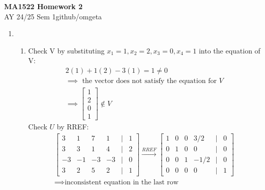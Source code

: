 \documentclass[12pt, a4paper]{article}
\newcommand{\mytitle}{MA1522 Homework 2}
\newcommand{\myauthor}{github/omgeta}
\newcommand{\mydate}{AY 24/25 Sem 1}
\begin{document}
\raggedright
\footnotesize
\begin{center}
{\normalsize{\textbf{\mytitle}}} \\
{\footnotesize{\mydate\hspace{2pt}\textemdash\hspace{2pt}\myauthor}}
\end{center}

\begin{enumerate}[Q\arabic*.]
  \item 
    \begin{enumerate}[(\alph*)]
      \item Check V by substituting $x_1 = 1, x_2 = 2, x_3 = 0, x_4 = 1$ into the equation of V:
        \begin{gather*}
          2(1) + 1(2) -3(1) = 1 \neq 0\\
                            \implies \text{ the vector does not satisfy the equation for }V \\
                            \implies  \begin{bmatrix}1\\2\\0\\1\end{bmatrix} \not\in V
        \end{gather*}
        Check $U$ by RREF:
        \begin{gather*}
          \begin{bmatrix}
            3 & 1 & 7 & 1 & | &1\\
            3 & 3 & 1 & 4 & | &2\\
            -3 & -1 & -3 & -3 & | &0\\
            3 & 2 & 5 & 2 & | &1
          \end{bmatrix} \xrightarrow{RREF}
          \begin{bmatrix}
            1 & 0 & 0 & 3 /2 & | & 0\\
            0 & 1 & 0 & 0 & | & 0\\
            0 & 0 & 1 & -1 /2 & | & 0\\
            0 & 0 & 0 & 0 & | & 1
          \end{bmatrix}\\
          \implies \text{inconsistent equation in the last row}\\

\end{gather*}
\end{enumerate}
\end{enumerate}
\end{document}
